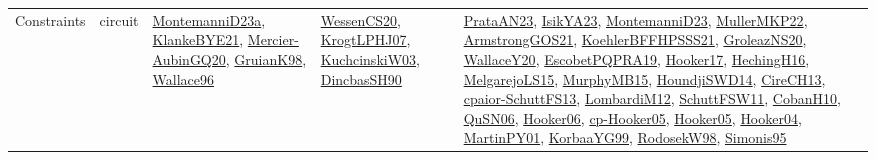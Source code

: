 {\begin{longtable}{lp{3cm}>{\raggedright}p{6cm}>{\raggedright}p{6cm}p{8cm}}
Constraints & circuit & \href{articles/MontemanniD23a.pdf}{MontemanniD23a}\cite{MontemanniD23a}, \href{papers/KlankeBYE21.pdf}{KlankeBYE21}\cite{KlankeBYE21}, \href{papers/Mercier-AubinGQ20.pdf}{Mercier-AubinGQ20}\cite{Mercier-AubinGQ20}, \href{papers/GruianK98.pdf}{GruianK98}\cite{GruianK98}, \href{articles/Wallace96.pdf}{Wallace96}\cite{Wallace96} & \href{papers/WessenCS20.pdf}{WessenCS20}\cite{WessenCS20}, \href{papers/KrogtLPHJ07.pdf}{KrogtLPHJ07}\cite{KrogtLPHJ07}, \href{articles/KuchcinskiW03.pdf}{KuchcinskiW03}\cite{KuchcinskiW03}, \href{articles/DincbasSH90.pdf}{DincbasSH90}\cite{DincbasSH90} & \href{articles/PrataAN23.pdf}{PrataAN23}\cite{PrataAN23}, \href{articles/IsikYA23.pdf}{IsikYA23}\cite{IsikYA23}, \href{articles/MontemanniD23.pdf}{MontemanniD23}\cite{MontemanniD23}, \href{articles/MullerMKP22.pdf}{MullerMKP22}\cite{MullerMKP22}, \href{papers/ArmstrongGOS21.pdf}{ArmstrongGOS21}\cite{ArmstrongGOS21}, \href{articles/KoehlerBFFHPSSS21.pdf}{KoehlerBFFHPSSS21}\cite{KoehlerBFFHPSSS21}, \href{papers/GroleazNS20.pdf}{GroleazNS20}\cite{GroleazNS20}, \href{articles/WallaceY20.pdf}{WallaceY20}\cite{WallaceY20}, \href{articles/EscobetPQPRA19.pdf}{EscobetPQPRA19}\cite{EscobetPQPRA19}, \href{papers/Hooker17.pdf}{Hooker17}\cite{Hooker17}, \href{papers/HechingH16.pdf}{HechingH16}\cite{HechingH16}, \href{papers/MelgarejoLS15.pdf}{MelgarejoLS15}\cite{MelgarejoLS15}, \href{papers/MurphyMB15.pdf}{MurphyMB15}\cite{MurphyMB15}, \href{papers/HoundjiSWD14.pdf}{HoundjiSWD14}\cite{HoundjiSWD14}, \href{papers/CireCH13.pdf}{CireCH13}\cite{CireCH13}, \href{papers/cpaior-SchuttFS13.pdf}{cpaior-SchuttFS13}\cite{cpaior-SchuttFS13}, \href{articles/LombardiM12.pdf}{LombardiM12}\cite{LombardiM12}, \href{articles/SchuttFSW11.pdf}{SchuttFSW11}\cite{SchuttFSW11}, \href{papers/CobanH10.pdf}{CobanH10}\cite{CobanH10}, \href{papers/QuSN06.pdf}{QuSN06}\cite{QuSN06}, \href{articles/Hooker06.pdf}{Hooker06}\cite{Hooker06}, \href{papers/cp-Hooker05.pdf}{cp-Hooker05}\cite{cp-Hooker05}, \href{articles/Hooker05.pdf}{Hooker05}\cite{Hooker05}, \href{papers/Hooker04.pdf}{Hooker04}\cite{Hooker04}, \href{articles/MartinPY01.pdf}{MartinPY01}\cite{MartinPY01}, \href{papers/KorbaaYG99.pdf}{KorbaaYG99}\cite{KorbaaYG99}, \href{papers/RodosekW98.pdf}{RodosekW98}\cite{RodosekW98}, \href{papers/Simonis95.pdf}{Simonis95}\cite{Simonis95}\\

\end{longtable}}
